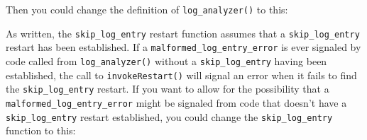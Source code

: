 \begin{Shaded}
\begin{Highlighting}[]
\StringTok{ }\NormalTok{() }\NormalTok{(}\NormalTok{)}
\end{Highlighting}
\end{Shaded}

Then you could change the definition of \texttt{log\_analyzer()} to
this:

\begin{Shaded}
\begin{Highlighting}[]
\StringTok{ }\NormalTok{() \{}
\StringTok{ }\NormalTok{()}
  
  \NormalTok{(}
\NormalTok{  )}
\NormalTok{\}}
\end{Highlighting}
\end{Shaded}

As written, the \texttt{skip\_log\_entry} restart function assumes that
a \texttt{skip\_log\_entry} restart has been established. If a
\texttt{malformed\_log\_entry\_error} is ever signaled by code called
from \texttt{log\_analyzer()} without a \texttt{skip\_log\_entry} having
been established, the call to \texttt{invokeRestart()} will signal an
error when it fails to find the \texttt{skip\_log\_entry} restart. If
you want to allow for the possibility that a
\texttt{malformed\_log\_entry\_error} might be signaled from code that
doesn't have a \texttt{skip\_log\_entry} restart established, you could
change the \texttt{skip\_log\_entry} function to this:

\begin{Shaded}
\begin{Highlighting}[]
\StringTok{ }\NormalTok{() \{}
\StringTok{ }\NormalTok{(}\NormalTok{) }
  \NormalTok{ (}\NormalTok{()}
  
\NormalTok{\}}
\end{Highlighting}
\end{Shaded}

